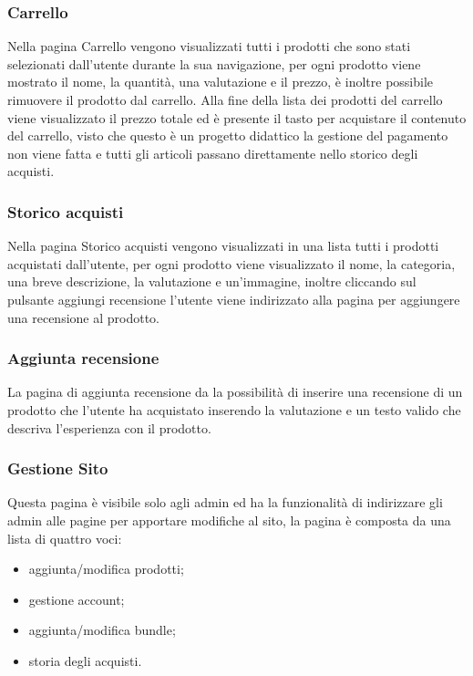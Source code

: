 \subsubsection{Carrello}
Nella pagina Carrello vengono visualizzati tutti i prodotti che sono stati selezionati dall'utente durante la sua navigazione, per ogni prodotto viene mostrato il nome, la quantità, una valutazione e il prezzo, è inoltre possibile rimuovere il prodotto dal carrello.\newline
Alla fine della lista dei prodotti del carrello viene visualizzato il prezzo totale ed è presente il tasto per acquistare il contenuto del carrello, visto che questo è un progetto didattico la gestione del pagamento non viene fatta e tutti gli articoli passano direttamente nello storico degli acquisti.

\subsubsection{Storico acquisti}
Nella pagina Storico acquisti vengono visualizzati in una lista tutti i prodotti acquistati dall'utente, per ogni prodotto viene visualizzato il nome, la categoria, una breve descrizione, la valutazione e un'immagine, inoltre cliccando sul pulsante aggiungi recensione l'utente viene indirizzato alla pagina per aggiungere una recensione al prodotto.

\subsubsection{Aggiunta recensione}
La pagina di aggiunta recensione da la possibilità di inserire una recensione di un prodotto che l'utente ha acquistato inserendo la valutazione e un testo valido che descriva l'esperienza con il prodotto.

\subsubsection{Gestione Sito}
Questa pagina è visibile solo agli admin ed ha la funzionalità di indirizzare gli admin alle pagine per apportare modifiche al sito, la pagina è composta da una lista di quattro voci:
\begin{itemize}
	\item aggiunta/modifica prodotti;
	\item gestione account;
	\item aggiunta/modifica bundle;
	\item storia degli acquisti.
\end{itemize}

